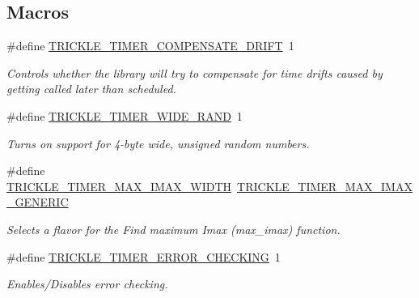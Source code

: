 \subsection*{Macros}
\begin{DoxyCompactItemize}
\item 
\#define \hyperlink{group__trickle-timer_ga361fa866c3bba8e5a05de3b957bc04c1}{T\+R\+I\+C\+K\+L\+E\+\_\+\+T\+I\+M\+E\+R\+\_\+\+C\+O\+M\+P\+E\+N\+S\+A\+T\+E\+\_\+\+D\+R\+I\+F\+T}~1
\begin{DoxyCompactList}\small\item\em Controls whether the library will try to compensate for time drifts caused by getting called later than scheduled. \end{DoxyCompactList}\item 
\#define \hyperlink{group__trickle-timer_ga2b3b9fd1a895243db18b35b7600bac15}{T\+R\+I\+C\+K\+L\+E\+\_\+\+T\+I\+M\+E\+R\+\_\+\+W\+I\+D\+E\+\_\+\+R\+A\+N\+D}~1
\begin{DoxyCompactList}\small\item\em Turns on support for 4-\/byte wide, unsigned random numbers. \end{DoxyCompactList}\item 
\#define \hyperlink{group__trickle-timer_ga157285503882e567c275871fd30d3016}{T\+R\+I\+C\+K\+L\+E\+\_\+\+T\+I\+M\+E\+R\+\_\+\+M\+A\+X\+\_\+\+I\+M\+A\+X\+\_\+\+W\+I\+D\+T\+H}~\hyperlink{group__trickle-timer_ga63607c0782cac7d825d07bff8c89b3d4}{T\+R\+I\+C\+K\+L\+E\+\_\+\+T\+I\+M\+E\+R\+\_\+\+M\+A\+X\+\_\+\+I\+M\+A\+X\+\_\+\+G\+E\+N\+E\+R\+I\+C}
\begin{DoxyCompactList}\small\item\em Selects a flavor for the \textquotesingle{}Find maximum Imax\textquotesingle{} (max\+\_\+imax) function. \end{DoxyCompactList}\item 
\#define \hyperlink{group__trickle-timer_gad47a05440295b6f171873f5f43384e56}{T\+R\+I\+C\+K\+L\+E\+\_\+\+T\+I\+M\+E\+R\+\_\+\+E\+R\+R\+O\+R\+\_\+\+C\+H\+E\+C\+K\+I\+N\+G}~1
\begin{DoxyCompactList}\small\item\em Enables/\+Disables error checking. \end{DoxyCompactList}\end{DoxyCompactItemize}
